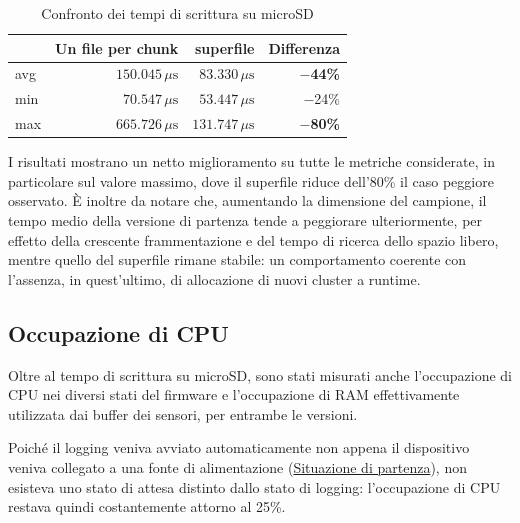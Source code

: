 \begin{table}[H]
    \centering
    \begin{tabular}{lrrr}
        \hline
        &
        \textbf{Un file per chunk} &
        \textbf{superfile} &
        \textbf{Differenza} \\
        \hline

        avg &
        $150.045\,\mu\mathrm{s}$ &
        $83.330\,\mu\mathrm{s}$ &
        \textbf{$-$44\%} \\

        min &
        $70.547\,\mu\mathrm{s}$ &
        $53.447\,\mu\mathrm{s}$ &
        $-$24\% \\

        max &
        $665.726\,\mu\mathrm{s}$ &
        $131.747\,\mu\mathrm{s}$ &
        \textbf{$-$80\%} \\

        \hline
    \end{tabular}
    \caption{Confronto dei tempi di scrittura su microSD}
    \label{tab:benchmark_scrittura_sd}
\end{table}

I risultati mostrano un netto miglioramento su tutte le metriche
considerate, in particolare sul valore massimo, dove il superfile riduce
dell'80\% il caso peggiore osservato. È inoltre da notare che, aumentando la
dimensione del campione, il tempo medio della versione di partenza tende a
peggiorare ulteriormente, per effetto della crescente frammentazione e del
tempo di ricerca dello spazio libero, mentre quello del superfile rimane
stabile: un comportamento coerente con l'assenza, in quest'ultimo, di
allocazione di nuovi cluster a runtime.


\subsection{Occupazione di CPU}
\label{subsubsec:cpu-occupazione}
\label{subsec:cpu_ram}

Oltre al tempo di scrittura su microSD, sono stati misurati anche
l'occupazione di CPU nei diversi stati del firmware e l'occupazione di RAM
effettivamente utilizzata dai buffer dei sensori, per entrambe le versioni.

Poiché il logging veniva avviato automaticamente non appena il dispositivo
veniva collegato a una fonte di alimentazione (\hyperref[sec:situazione-partenza]{Situazione
di partenza}), non esisteva uno stato di attesa distinto dallo stato di
logging: l'occupazione di CPU restava quindi costantemente attorno al
25\%.

